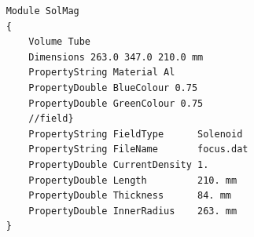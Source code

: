 \begin{verbatim}
    Module SolMag
    {
        Volume Tube
        Dimensions 263.0 347.0 210.0 mm
        PropertyString Material Al
        PropertyDouble BlueColour 0.75
        PropertyDouble GreenColour 0.75
        //field}
        PropertyString FieldType      Solenoid
        PropertyString FileName       focus.dat
        PropertyDouble CurrentDensity 1.
        PropertyDouble Length         210. mm
        PropertyDouble Thickness      84. mm
        PropertyDouble InnerRadius    263. mm
    }
\end{verbatim}

